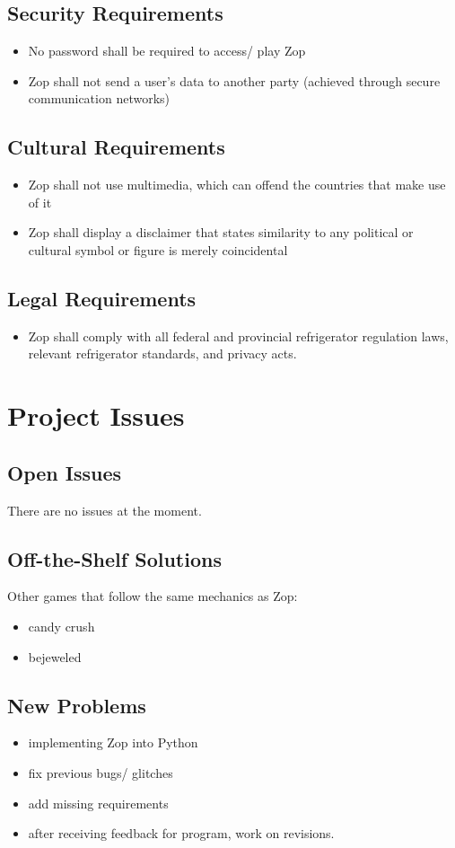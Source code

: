 \documentclass[12pt]{article}
\begin{document}
 \subsection{Security Requirements}
\begin{itemize}
 \item No password shall be required to access/ play Zop
 \item Zop shall not send a user’s data to another party (achieved through secure communication networks)
\end{itemize}
\subsection{Cultural Requirements}
\begin{itemize}
 \item Zop shall not use multimedia, which can offend the countries that make use of it
 \item Zop shall display a disclaimer that states similarity to any political or cultural symbol or figure is merely coincidental
\end{itemize}
\subsection{Legal Requirements}
\begin{itemize}
 \item Zop shall comply with all federal and provincial refrigerator regulation laws, relevant refrigerator standards, and privacy acts.
\end{itemize}

\section{Project Issues}
\subsection{Open Issues}
There are no issues at the moment.
\subsection{Off-the-Shelf Solutions}
 Other games that follow the same mechanics as Zop:
 \begin{itemize}
  \item candy crush
  \item bejeweled
 \end{itemize}
 
\subsection{New Problems}
\begin{itemize}
 \item implementing Zop into Python
 \item fix previous bugs/ glitches
 \item add missing requirements
 \item after receiving feedback for program, work on revisions.
\end{itemize}
\newpage
\end{document}
